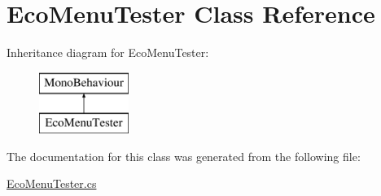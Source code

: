 \hypertarget{class_eco_menu_tester}{}\section{Eco\+Menu\+Tester Class Reference}
\label{class_eco_menu_tester}
Inheritance diagram for Eco\+Menu\+Tester\+:\begin{figure}[H]
\begin{center}
\leavevmode
\includegraphics[height=2.000000cm]{class_eco_menu_tester}
\end{center}
\end{figure}


The documentation for this class was generated from the following file\+:\begin{DoxyCompactItemize}
\item 
\mbox{\hyperlink{_eco_menu_tester_8cs}{Eco\+Menu\+Tester.\+cs}}\end{DoxyCompactItemize}
